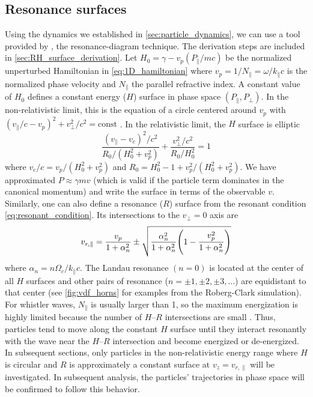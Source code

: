 \subsection{Resonance surfaces}\label{sec:resonance_surfaces}


Using the dynamics we established in \cref{sec:particle_dynamics},
we can use a tool provided by \cite{Karimabadi1990}, the resonance-diagram
technique. The derivation steps are included in
\cref{sec:RH_surface_derivation}. Let $H_0=\gamma-v_p(P_\|/mc)$ be the
normalized unperturbed Hamiltonian in \cref{eq:1D_hamiltonian} where
$v_p=1/N_\|=\omega/k_\|c$ is the normalized phase velocity and $N_\|$ the
parallel refractive index. A constant value of $H_0$ defines a constant energy
($H$) surface in phase space $(P_\|,P_\bot)$. In the non-relativistic limit,
this is the equation of a circle centered around $v_p$ with $(v_\|/c-v_p)^2+v_\perp^2/c^2=\text{const}$ \citep{RobergClark2019}. In the relativistic limit, the $H$ surface is elliptic
\begin{equation}\label{eq:constant_H_surface}
    \frac{(v_\|-v_c)^2/c^2}{R_0/(H_0^2+v_p^2)}+\frac{v_\perp^2/c^2}{R_0/H_0^2}=1
\end{equation}
where $v_c/c=v_p/(H_0^2+v_p^2)$ and $R_0=H_0^2-1+v_p^2/(H_0^2+v_p^2)$. We have approximated $P\approx \gamma
mv$ (which is valid if the particle term dominates in the canonical momentum)
and write the surface in terms of the observable $v$. Similarly, one can also
define a resonance ($R$) surface from the resonant condition
\cref{eq:resonant_condition}. Its intersections to the $v_\perp=0$ axis
are
\begin{equation}\label{eq:resonant_velocity}
    v_{r,\|}=\frac{v_p}{1+\alpha_n^2}\pm\sqrt{\frac{\alpha_n^2}{1+\alpha_n^2}\qty(1-\frac{v_p^2}{1+\alpha_n^2})}
\end{equation}
where $\alpha_n=n\Omega_c/k_\|c$. The Landau resonance $(n=0)$ is located at the
center of all $H$ surfaces and other pairs of resonance
($n=\pm1,\pm2,\pm3,\hdots$) are equidistant to that center (see
\cref{fig:vdf_horns} for examples from the Roberg-Clark simulation). For whistler waves, $N_\|$ is usually larger than 1, so the maximum energization is highly limited because the number of $H$--$R$ intersections are small \citep{Karimabadi1990}. Thus, particles tend to move along the constant $H$ surface until they interact resonantly with the wave near the $H$--$R$ intersection and become energized or de-energized. In subsequent sections,
only particles in the non-relativistic energy range where $H$ is circular and
$R$ is approximately a constant surface at $v_z=v_{r,\|}$ will be investigated. 
In subsequent analysis, the particles' trajectories in phase space will be
confirmed to follow this behavior.

